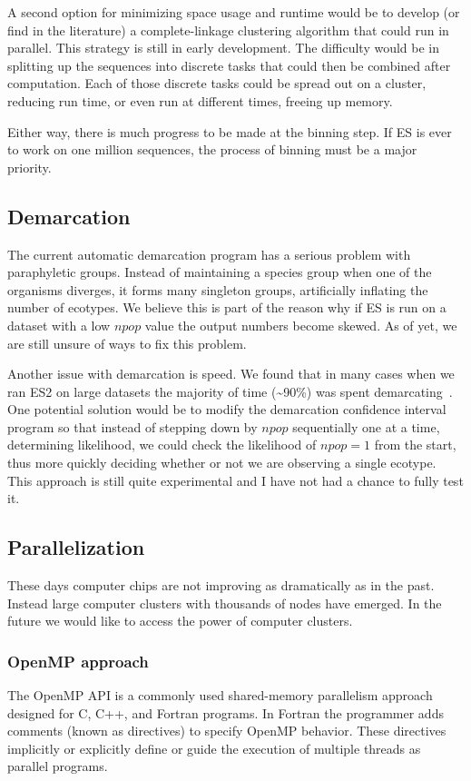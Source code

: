 A second option for minimizing space usage and runtime would be to develop (or find in the literature) a complete-linkage clustering algorithm that could run in parallel.
This strategy is still in early development.
The difficulty would be in splitting up the sequences into discrete tasks that could then be combined after computation.
Each of those discrete tasks could be spread out on a cluster, reducing run time, or even run at different times, freeing up memory.

Either way, there is much progress to be made at the binning step.
If ES is ever to work on one million sequences, the process of binning must be a major priority.

\subsection*{Demarcation}
The current automatic demarcation program has a serious problem with paraphyletic groups.
Instead of maintaining a species group when one of the organisms diverges, it forms many singleton groups, artificially inflating the number of ecotypes.
We believe this is part of the reason why if ES is run on a dataset with a low $npop$ value the output numbers become skewed.
As of yet, we are still unsure of ways to fix this problem.

Another issue with demarcation is speed.
We found that in many cases when we ran ES2 on large datasets the majority of time (\textasciitilde90\%) was spent demarcating~\cite{lingThesis}.
One potential solution would be to modify the demarcation confidence interval program so that instead of stepping down by $npop$ sequentially one at a time, determining likelihood, we could check the likelihood of $npop = 1$ from the start, thus more quickly deciding whether or not we are observing a single ecotype.
This approach is still quite experimental and I have not had a chance to fully test it.

\subsection*{Parallelization}
These days computer chips are not improving as dramatically as in the past.
Instead large computer clusters with thousands of nodes have emerged.
In the future we would like to access the power of computer clusters.

\subsubsection*{OpenMP approach}
The OpenMP API is a commonly used shared-memory parallelism approach designed for C, C++, and Fortran programs.
In Fortran the programmer adds comments (known as directives) to specify OpenMP behavior.
These directives implicitly or explicitly define or guide the execution of multiple threads as parallel programs.

